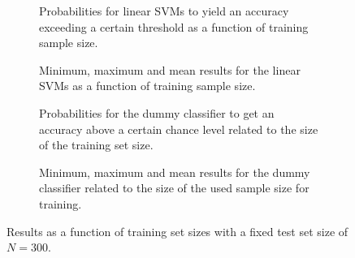 \documentclass{article}
\begin{document}
    \begin{figure}
        \captionsetup[subfigure]{justification=justified,singlelinecheck=false}
        \begin{subfigure}[t]{0.61\textwidth}
            
            \caption{Probabilities for linear SVMs to yield an accuracy exceeding a certain threshold as a function of training sample size. }
        \end{subfigure}
        \hspace{3.0mm}
        \begin{subfigure}[t]{0.34\textwidth}
            
            \caption{Minimum, maximum and mean results for the linear SVMs as a function of training sample size. }
        \end{subfigure}

        \vspace{3.0mm}

        \begin{subfigure}[t]{0.61\textwidth}
            
            \caption{Probabilities for the dummy classifier to get an accuracy above a certain chance level related to the size of the training set size.}
        \end{subfigure}
        \hspace{3.0mm}
        \begin{subfigure}[t]{0.34\textwidth}
            
            \caption{Minimum, maximum and mean results for the dummy classifier related to the size of the used sample size for training.}
        \end{subfigure}
        \caption{Results as a function of training set sizes with a fixed test set size of $N = 300$.}
        \label{fig:train_sample_size_effects}
    \end{figure}
\end{document}
